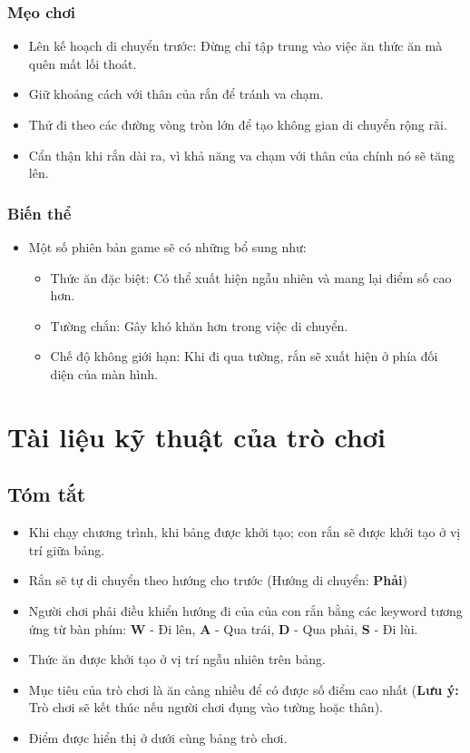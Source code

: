 \documentclass[a4paper, 12pt]{article}
\begin{document}
\subsubsection{Mẹo chơi}
\begin{itemize}
    \item Lên kế hoạch di chuyển trước: Đừng chỉ tập trung vào việc ăn thức ăn mà quên mất lối thoát.
    \item Giữ khoảng cách với thân của rắn để tránh va chạm.
    \item Thử đi theo các đường vòng tròn lớn để tạo không gian di chuyển rộng rãi.
    \item Cẩn thận khi rắn dài ra, vì khả năng va chạm với thân của chính nó sẽ tăng lên.
\end{itemize}

\subsubsection{Biến thể}
\begin{itemize}
    \item Một số phiên bản game sẽ có những bổ sung như:
    \begin{itemize}
        \item Thức ăn đặc biệt: Có thể xuất hiện ngẫu nhiên và mang lại điểm số cao hơn.
        \item Tường chắn: Gây khó khăn hơn trong việc di chuyển.
        \item Chế độ không giới hạn: Khi đi qua tường, rắn sẽ xuất hiện ở phía đối diện của màn hình.
    \end{itemize}
\end{itemize}

\section{Tài liệu kỹ thuật của trò chơi}
\subsection{Tóm tắt}
\begin{itemize}
    \item Khi chạy chương trình, khi bảng được khởi tạo; con rắn sẽ được khởi tạo ở vị trí giữa bảng.
    \item Rắn sẽ tự di chuyển theo hướng cho trước (Hướng di chuyển: \textbf{Phải})
    \item Người chơi phải điều khiển hướng đi của của con rắn bằng các keyword tương ứng từ bàn phím: \textbf{W} - Đi lên, \textbf{A} - Qua trái, \textbf{D} - Qua phải, \textbf{S} - Đi lùi.
    \item Thức ăn được khởi tạo ở vị trí ngẫu nhiên trên bảng.
    \item Mục tiêu của trò chơi là ăn càng nhiều để có được số điểm cao nhất (\textbf{Lưu ý:} Trò chơi sẽ kết thúc nếu người chơi đụng vào tường hoặc thân).
    \item Điểm được hiển thị ở dưới cùng bảng trò chơi.
\end{itemize}
\end{document}
